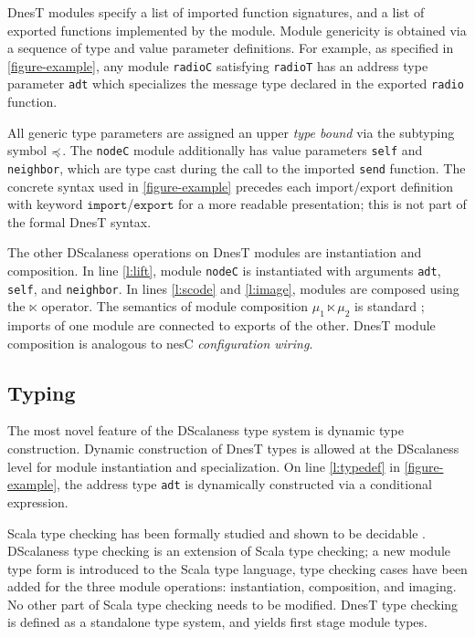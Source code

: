 DnesT modules specify a list of imported function signatures, and a list of exported functions
implemented by the module. Module genericity is obtained via a sequence of type and value
parameter definitions. For example, as specified in \autoref{figure-example}, any module
\texttt{radioC} satisfying \texttt{radioT} has an address type parameter \texttt{adt} which
specializes the message type declared in the exported \texttt{radio} function.

All generic type parameters are assigned an upper \emph{type bound} via the subtyping symbol
$\preccurlyeq$. The \texttt{nodeC} module additionally has value parameters \texttt{self} and
\texttt{neighbor}, which are type cast during the call to the imported \texttt{send} function.
The concrete syntax used in \autoref{figure-example} precedes each import/export definition with
keyword $\texttt{import}$/$\texttt{export}$ for a more readable presentation; this is not part
of the formal DnesT syntax.
  
The other DScalaness operations on DnesT modules are instantiation and composition. In line
\ref{l:lift}, module \texttt{nodeC} is instantiated with arguments \texttt{adt}, \texttt{self},
and \texttt{neighbor}. In lines \ref{l:scode} and \ref{l:image}, modules are composed using the
$\ltimes$ operator. The semantics of module composition $\mu_1 \ltimes \mu_2$ is standard
\cite{Cardelli-1997}; imports of one module are connected to exports of the other. DnesT module
composition is analogous to nesC \emph{configuration wiring}.

\subsection{Typing} 

The most novel feature of the DScalaness type system is dynamic type construction. Dynamic
construction of DnesT types is allowed at the DScalaness level for module instantiation and
specialization. On line \ref{l:typedef} in \autoref{figure-example}, the address type
\texttt{adt} is dynamically constructed via a conditional expression.

Scala type checking has been formally studied and shown to be decidable
\cite{Cremet:2006:CCS:2135978.2135980}. DScalaness type checking is an extension of Scala type
checking; a new module type form is introduced to the Scala type language, type checking cases
have been added for the three module operations: instantiation, composition, and imaging. No
other part of Scala type checking needs to be modified. DnesT type checking is defined as a
standalone type system, and yields first stage module types.

